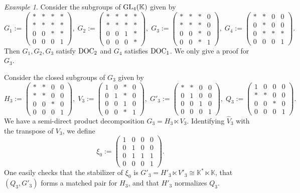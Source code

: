 \documentclass[a4paper,11pt,reqno]{amsart}
\numberwithin{equation}{section}
\theoremstyle{remark}
\newtheorem{example}[theorem]{Example}
\theoremstyle{definition}
\newcommand{\K}{\mathbb K}
\begin{document}
\begin{example}
\label{E3}
Consider the subgroups of ${\rm GL}_4(\K)$ given by
$$
G_1:=\begin{pmatrix}
*&*&*&*\\
*&*&*&*\\
0&0&*&*\\
0&0&0&1\end{pmatrix},\;
G_2:=\begin{pmatrix}
*&*&*&*\\
*&*&*&*\\
0&0&1&*\\
0&0&0&*\end{pmatrix},\;
G_3:=\begin{pmatrix}
*&*&*&0\\
*&*&*&0\\
0&0&*&0\\
0&0&*&1
 \end{pmatrix},\;
 G_4:=\begin{pmatrix}
*&*&0&0\\
0&*&0&0\\
0&*&*&*\\
0&0&0&1
 \end{pmatrix}.
$$
Then  $G_1, G_2, G_3$  satisfy   ${\rm DOC_2}$
and $G_4$ satisfies   ${\rm DOC_1}$.
We only give a proof for $G_3$.

Consider the closed subgroups of $G_3$ given by
 $$
 H_3:= \begin{pmatrix}
*&*&0&0\\
*&*&0&0\\
0&0&*&0\\
0&0&0&1
 \end{pmatrix},
\; V_3:=\begin{pmatrix}
1&0&*&0\\
0&1&*&0\\
0&0&1&0\\
0&0&*&1
 \end{pmatrix},
\;
 G'_3:=\begin{pmatrix}
*&*&0&0\\
0&1&0&0\\
0&0&1&0\\
0&0&0&1
 \end{pmatrix},
\;
 Q_3:=\begin{pmatrix}
1&0&0&0\\
*&*&0&0\\
0&0&*&0\\
0&0&0&1
 \end{pmatrix}.
$$
We have a semi-direct product decomposition $G_3=H_3\ltimes V_3$. Identifying $\hat V_3$ with the transpose of $V_3$, we define
 $$
 \xi_0:=
\begin{pmatrix}
1&0&0&0\\
0&1&0&0\\
0&1&1&1\\
0&0&0&1
 \end{pmatrix}.
 $$
 One easily checks that   the stabilizer of $\xi_0$ is $G'_3=H'_3\ltimes V'_3\cong\K^*\ltimes\K$, that
$(Q_3,G'_3)$ forms a matched pair for $H_3$, and that $H'_3$ normalizes $Q_3$.
\end{example}
\end{document}
